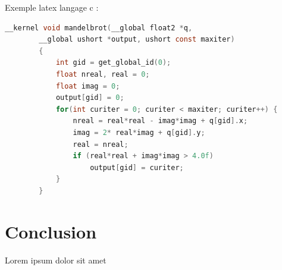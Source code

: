 \documentclass[12pt, openany]{report}
\begin{document}
Exemple latex langage c :
\begin{lstlisting}[language=C]
        __kernel void mandelbrot(__global float2 *q, 
        __global ushort *output, ushort const maxiter)
        {
            int gid = get_global_id(0);
            float nreal, real = 0;
            float imag = 0;
            output[gid] = 0;
            for(int curiter = 0; curiter < maxiter; curiter++) {
                nreal = real*real - imag*imag + q[gid].x;
                imag = 2* real*imag + q[gid].y;
                real = nreal;
                if (real*real + imag*imag > 4.0f)
                    output[gid] = curiter;
            }
        }
      \end{lstlisting}

\section{Conclusion}
Lorem ipsum dolor sit amet




\end{document}
